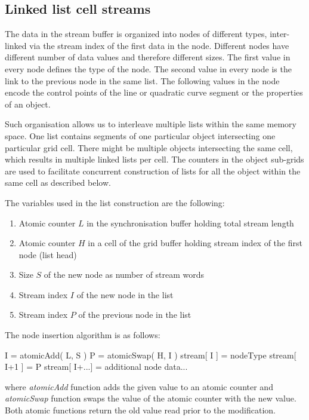 \documentclass[11pt,a4paper,twoside]{article}
\begin{document}
\subsection {Linked list cell streams}

The data in the stream buffer is organized into nodes of different types, inter-linked via the stream index of the first data in the node. Different nodes have different number of data values and therefore different sizes. The first value in every node defines the type of the node. The second value in every node is the link to the previous node in the same list. The following values in the node encode the control points of the line or quadratic curve segment or the properties of an object.

Such organisation allows us to interleave multiple lists within the same memory space. One list contains segments of one particular object intersecting one particular grid cell. There might be multiple objects intersecting the same cell, which results in multiple linked lists per cell. The counters in the object sub-grids are used to facilitate concurrent construction of lists for all the object within the same cell as described below.

The variables used in the list construction are the following:

\begin {enumerate}
\item
Atomic counter $L$ in the synchronisation buffer holding total stream length
\item
Atomic counter $H$ in a cell of the grid buffer holding stream index of the first node (list head)
\item
Size $S$ of the new node as number of stream words
\item
Stream index $I$ of the new node in the list
\item
Stream index $P$ of the previous node in the list
\end {enumerate}

The node insertion algorithm is as follows:
\begin{verbatimtab}
	I = atomicAdd( L, S )
	P = atomicSwap( H, I )
	stream[ I ] = nodeType
	stream[ I+1 ] = P
	stream[ I+...] = additional node data...
\end{verbatimtab}

where \emph{atomicAdd} function adds the given value to an atomic counter and \emph{atomicSwap} function swaps the value of the atomic counter with the new value. Both atomic functions return the old value read prior to the modification.
\end{document}
